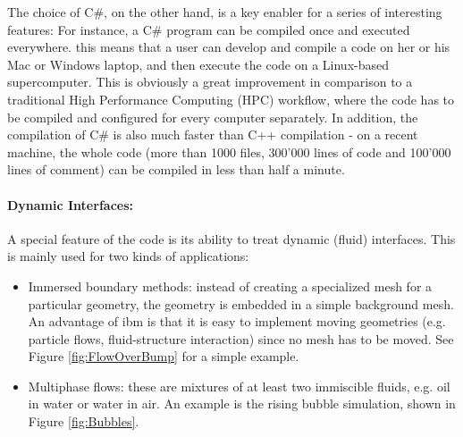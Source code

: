 \documentclass[a4paper,10pt]{report} %
\begin{document}
The choice of C\#, on the other hand, is a key enabler for a series of interesting features:
For instance, a C\# program can be compiled once and executed everywhere. this means that a user can
develop and compile a code on her or his Mac or Windows laptop, and then execute
the code on a Linux-based supercomputer. This is obviously a great improvement
in comparison to a traditional High Performance Computing (HPC) workflow, where the code has to be compiled and configured
for every computer separately. In addition, the compilation of C\# is also much faster than
C++ compilation - on a recent machine, the whole \BoSSS{} code
(more than 1000 files, 300'000 lines of code and 100'000 lines of comment)
can be compiled in less than half a minute.




\paragraph{Dynamic Interfaces:} 
A special feature of the \BoSSS{} code is its ability to treat dynamic (fluid) interfaces.
This is mainly used for two kinds of applications:
\begin{itemize}
\item
Immersed boundary methods: instead of creating a specialized mesh for a particular geometry,
the geometry is embedded in a simple background mesh.
An advantage of \ac{ibm} is that it is easy to implement moving geometries
(e.g. particle flows, fluid-structure interaction) since no mesh has to be moved.
See Figure \ref{fig:FlowOverBump} for a simple example.

\item
Multiphase flows: these are mixtures of at least two immiscible fluids, 
e.g. oil in water or water in air.
An example is the rising bubble simulation, shown in Figure \ref{fig:Bubbles}.

\end{itemize}
\end{document}
